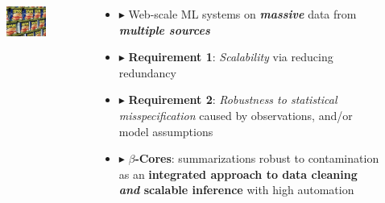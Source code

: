 \documentclass[hyperref={colorlinks = true},unknownkeysallowed]{beamer}
\begin{document}
\begin{frame}[fragile,t]
\begin{columns}[onlytextwidth]
\begin{column}{0.35\textwidth}
\begin{center}
				\vspace{-.4cm} 
				
				\begin{figure}
					\includegraphics[width=0.9\textwidth,angle=-5]{figs/spam.jpg}
				\end{figure}
			\end{center}
		\end{column}
		\begin{column}{0.65\textwidth}
			\vspace{-2.6cm} 
			
			\begin{itemize}
				\item $\blacktriangleright$ Web-scale ML systems on \emph{\textbf{massive}} data from \emph{\textbf{multiple sources}}
				\item $\blacktriangleright$ \textbf{Requirement 1}: \emph{Scalability}  via reducing redundancy
				\item $\blacktriangleright$ \textbf{Requirement 2}: \emph{Robustness to statistical misspecification} caused by observations, and/or model assumptions   
				\item $\blacktriangleright$ \textbf{$\beta$-Cores}: summarizations robust to contamination as an \textbf{integrated approach to data cleaning \emph{and} scalable inference} with high automation
			\end{itemize}
		\end{column}
	\end{columns}
\end{frame}
\end{document}
